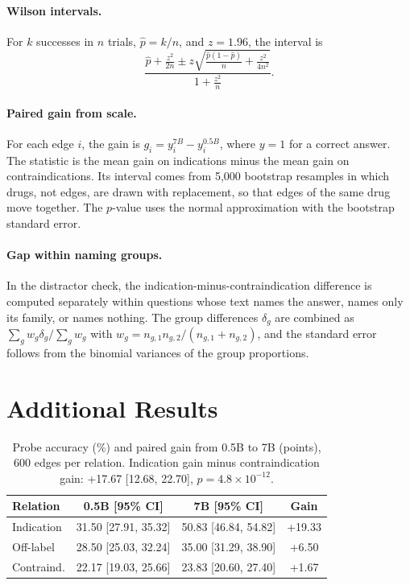 \documentclass[letterpaper]{article} %
\begin{document}
\paragraph{Wilson intervals.}
For $k$ successes in $n$ trials, $\hat p = k/n$, and $z = 1.96$, the interval
is
\begin{equation}
\frac{\hat p + \frac{z^2}{2n} \pm z\sqrt{\frac{\hat p(1-\hat p)}{n} +
\frac{z^2}{4n^2}}}{1 + \frac{z^2}{n}}.
\end{equation}

\paragraph{Paired gain from scale.}
For each edge $i$, the gain is $g_i = y_i^{7B} - y_i^{0.5B}$, where $y = 1$
for a correct answer. The statistic is the mean gain on indications minus the
mean gain on contraindications. Its interval comes from 5,000 bootstrap
resamples in which drugs, not edges, are drawn with replacement, so that edges
of the same drug move together. The $p$-value uses the normal approximation
with the bootstrap standard error.

\paragraph{Gap within naming groups.}
In the distractor check, the indication-minus-contraindication difference is
computed separately within questions whose text names the answer, names only
its family, or names nothing. The group differences $\delta_g$ are combined as
$\sum_g w_g \delta_g / \sum_g w_g$ with $w_g = n_{g,1} n_{g,2} / (n_{g,1} +
n_{g,2})$, and the standard error follows from the binomial variances of the
group proportions.

\section{Additional Results}

\begin{table}[h]
\centering
\small
\setlength{\tabcolsep}{2pt}
\begin{tabular}{lccc}
\toprule
Relation & 0.5B [95\% CI] & 7B [95\% CI] & Gain \\
\midrule
Indication & 31.50 [27.91, 35.32] & 50.83 [46.84, 54.82] & +19.33 \\
Off-label & 28.50 [25.03, 32.24] & 35.00 [31.29, 38.90] & +6.50 \\
Contraind. & 22.17 [19.03, 25.66] & 23.83 [20.60, 27.40] & +1.67 \\
\bottomrule
\end{tabular}
\caption{Probe accuracy (\%) and paired gain from 0.5B to 7B (points), 600
edges per relation. Indication gain minus contraindication gain: +17.67 [12.68,
22.70], $p = 4.8\times10^{-12}$.}
\label{tab:probe_full}
\end{table}
\end{document}
